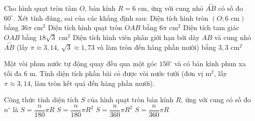 \begin{ex}%
	Cho hình quạt tròn tâm $O$, bán kính $R = 6\text{ cm}$, ứng với cung nhỏ $\overset{\frown}{AB}$ có số đo $60^\circ$. Xét tính đúng, sai của các khẳng định sau:
	\choiceTF
	{\True Diện tích hình tròn $(O; 6\text{ cm})$ bằng $36\pi\text{ cm}^2$}
	{\True Diện tích hình quạt tròn $OAB$ bằng $6\pi\text{ cm}^2$}
	{Diện tích tam giác $OAB$ bằng $18\sqrt{3}\text{ cm}^2$}
	{\True Diện tích hình viên phân giới hạn bởi dây $AB$ và cung nhỏ $\overset{\frown}{AB}$ (lấy $\pi \approx 3{,}14$, $\sqrt{3} \approx 1{,}73$ và làm tròn đến hàng phần mười) bằng $3{,}3\text{ cm}^2$}
\end{ex}

\begin{bt}%
	Một vòi phun nước tự động quay đều qua một góc $150^\circ$ và có bán kính phun xa tối đa $6\text{ m}$. Tính diện tích phần bãi cỏ được vòi nước tưới (đơn vị $\text{m}^2$, lấy $\pi \approx 3{,}14$, làm tròn kết quả đến hàng phần mười).
\end{bt}

\begin{ex}%
	Công thức tính diện tích $S$ của hình quạt tròn bán kính $R$, ứng với cung có số đo $n^\circ$ là
	\choice
	{$S = \dfrac{n}{180}\pi R$}
	{$S = \dfrac{n}{180}\pi R^2$}
	{\True $S = \dfrac{n}{360}\pi R^2$}
	{$S = \dfrac{n}{360}\pi R$}
\end{ex}

